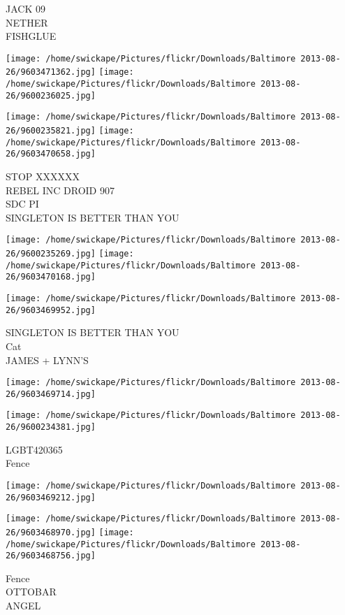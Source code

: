 \documentclass[10pt,letterpaper]{article}
\begin{document}
JACK 09\\
NETHER\\
FISHGLUE
\pagebreak

\texttt{[image: /home/swickape/Pictures/flickr/Downloads/Baltimore 2013-08-26/9603471362.jpg]}
\texttt{[image: /home/swickape/Pictures/flickr/Downloads/Baltimore 2013-08-26/9600236025.jpg]}

\texttt{[image: /home/swickape/Pictures/flickr/Downloads/Baltimore 2013-08-26/9600235821.jpg]}
\texttt{[image: /home/swickape/Pictures/flickr/Downloads/Baltimore 2013-08-26/9603470658.jpg]}

STOP XXXXXX\\
REBEL INC DROID 907\\
SDC PI\\
SINGLETON IS BETTER THAN YOU
\pagebreak

\texttt{[image: /home/swickape/Pictures/flickr/Downloads/Baltimore 2013-08-26/9600235269.jpg]}
\texttt{[image: /home/swickape/Pictures/flickr/Downloads/Baltimore 2013-08-26/9603470168.jpg]}

\texttt{[image: /home/swickape/Pictures/flickr/Downloads/Baltimore 2013-08-26/9603469952.jpg]}

SINGLETON IS BETTER THAN YOU\\
Cat\\
JAMES + LYNN'S
\pagebreak

\texttt{[image: /home/swickape/Pictures/flickr/Downloads/Baltimore 2013-08-26/9603469714.jpg]}

\vspace{0.25in}
\texttt{[image: /home/swickape/Pictures/flickr/Downloads/Baltimore 2013-08-26/9600234381.jpg]}

LGBT420365\\
Fence
\pagebreak

\texttt{[image: /home/swickape/Pictures/flickr/Downloads/Baltimore 2013-08-26/9603469212.jpg]}

\vspace{0.25in}
\texttt{[image: /home/swickape/Pictures/flickr/Downloads/Baltimore 2013-08-26/9603468970.jpg]}
\texttt{[image: /home/swickape/Pictures/flickr/Downloads/Baltimore 2013-08-26/9603468756.jpg]}

Fence\\
OTTOBAR\\
ANGEL
\pagebreak
\end{document}
